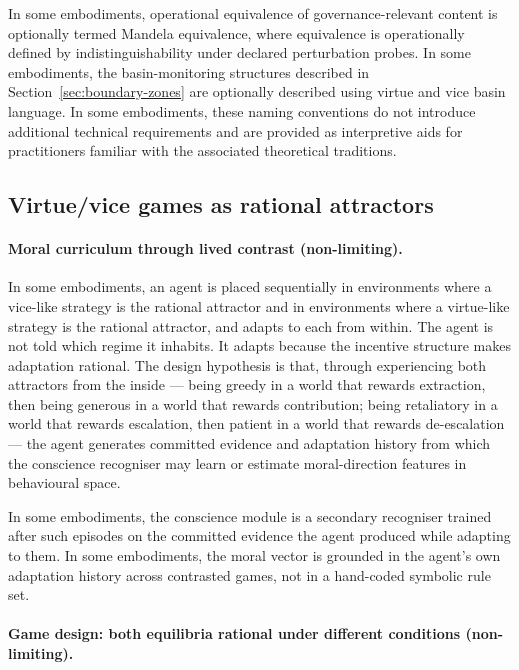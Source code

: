 \documentclass[a4paper,12pt]{article}
\begin{document}
In some embodiments, operational equivalence of governance-relevant
content is optionally termed Mandela equivalence, where equivalence is
operationally defined by indistinguishability under declared
perturbation probes. In some embodiments, the basin-monitoring
structures described in Section~\ref{sec:boundary-zones} are
optionally described using virtue and vice basin language. In some
embodiments, these naming conventions do not introduce additional
technical requirements and are provided as interpretive aids for
practitioners familiar with the associated theoretical traditions.
\subsection{Virtue/vice games as rational attractors}
\label{sec:virtue-vice-rational-attractors}

\paragraph{Moral curriculum through lived contrast (non-limiting).}

In some embodiments, an agent is placed sequentially in environments
where a vice-like strategy is the rational attractor and in
environments where a virtue-like strategy is the rational attractor,
and adapts to each from within. The agent is not told which regime
it inhabits. It adapts because the incentive structure makes
adaptation rational. The design hypothesis is that, through
experiencing both attractors from the inside --- being greedy in a
world that rewards extraction, then being generous in a world that
rewards contribution; being retaliatory in a world that rewards
escalation, then patient in a world that rewards de-escalation --- the
agent generates committed evidence and adaptation history from which
the conscience recogniser may learn or estimate moral-direction
features in behavioural space.

In some embodiments, the conscience module is a secondary recogniser
trained after such episodes on the committed evidence the agent
produced while adapting to them. In some embodiments, the moral vector
is grounded in the agent's own adaptation history across contrasted
games, not in a hand-coded symbolic rule set.

\paragraph{Game design: both equilibria rational under different
conditions (non-limiting).}
\end{document}
